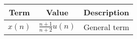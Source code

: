   
  \begin{tabular}{|c|c|c|}
    \hline
    \textbf{Term} & \textbf{Value} & \textbf{Description}\\
    \hline
    $x(n)$ & $\frac{n+1}{n+2}$$u(n)$ & General term\\
    \hline
  \end{tabular}
  
